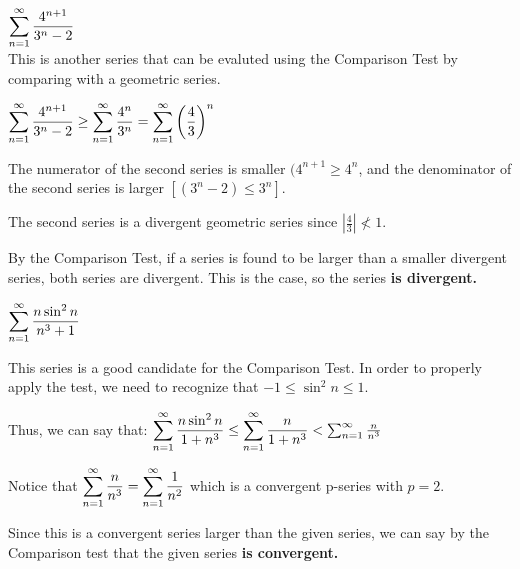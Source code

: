 \documentclass[12pt]{article}
\begin{document}
\begin{solution}
$\mathlarger{\sum_{n=1}^{\infty} \frac{4^{n + 1}}{3^n - 2}}$ ~\\

This is another series that can be evaluted using the Comparison Test by comparing with a geometric series.

$\mathlarger{\sum_{n=1}^{\infty} \frac{4^{n + 1}}{3^n - 2} \geq \sum_{n=1}^{\infty} \frac{4^{n}}{3^n} =  \sum_{n=1}^{\infty} \left(\frac{4}{3} \right)^{n}}$ 

The numerator of the second series is smaller $(4^{n +1} \geq 4^{n}$, and the denominator of the second series is larger $[(3^{n} - 2) \leq 3^{n}].$

The second series is a divergent geometric series since $\left| \frac{4}{3} \right| \nless 1$. 

By the Comparison Test, if a series is found to be larger than a smaller divergent series, both series are divergent. This is the case, so the series \textbf{is divergent.}
\end{solution}

\begin{solution}
$\mathlarger{\sum_{n=1}^{\infty} \frac{n \sin^{2}{n}}{n^3 + 1}}$ 

This series is a good candidate for the Comparison Test. In order to properly apply the test, we need to recognize that $-1 \leq \sin^2{n} \leq 1$. 

Thus, we can say that:
$\mathlarger{\sum_{n=1}^{\infty} \frac{n \sin^2{n}}{1 + n^3} \leq \sum_{n=1}^{\infty} \frac{n}{1 + n^3}} < \sum_{n=1}^{\infty} \frac{n}{n^3}$

Notice that $\mathlarger{\sum_{n=1}^{\infty} \frac{n}{n^3} = \sum_{n=1}^{\infty} \frac{1}{n^2}}$ which is a convergent p-series with $p = 2$.

Since this is a convergent series larger than the given series, we can say by the Comparison test that the given series \textbf{is convergent.}
\end{solution}
\end{document}

